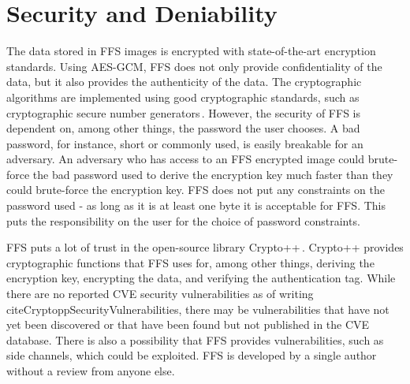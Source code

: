 \section{Security and Deniability}
The data stored in FFS images is encrypted with state-of-the-art encryption standards. Using AES-GCM, FFS does not only provide confidentiality of the data, but it also provides the authenticity of the data. The cryptographic algorithms are implemented using good cryptographic standards, such as cryptographic secure number generators\,\cite{RandomNumberGeneratorCryptoWiki2021}. However, the security of FFS is dependent on, among other things, the password the user chooses. A bad password, for instance, short or commonly used, is easily breakable for an adversary. An adversary who has access to an FFS encrypted image could brute-force the bad password used to derive the encryption key much faster than they could brute-force the encryption key. FFS does not put any constraints on the password used - as long as it is at least one byte it is acceptable for FFS. This puts the responsibility on the user for the choice of password constraints. 

FFS puts a lot of trust in the open-source library Crypto++\,\cite{CryptoLibraryFree}. Crypto++ provides cryptographic functions that FFS uses for, among other things, deriving the encryption key, encrypting the data, and verifying the authentication tag. While there are no reported CVE security vulnerabilities as of writing\,cite{CryptoppSecurityVulnerabilities}, there may be vulnerabilities that have not yet been discovered or that have been found but not published in the CVE database. There is also a possibility that FFS provides vulnerabilities, such as side channels, which could be exploited. FFS is developed by a single author without a review from anyone else.

